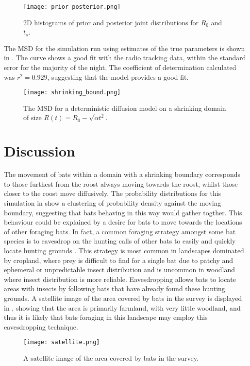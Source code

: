 \begin{figure} [h]
    \centering
        \texttt{[image: prior\_posterior.png]}
        \caption{2D histograms of prior and posterior joint distributions for $R_0$ and $t_s$.}
    \label{fig:posterior}
\end{figure}

 The MSD for the simulation run using estimates of the true parameters is shown in . The curve shows a good fit with the radio tracking data, within the standard error for the majority of the night. The coefficient of determination calculated was $r^2 = 0.929$, suggesting that the model provides a good fit.

\begin{figure} [h]
    \centering
        \texttt{[image: shrinking\_bound.png]}
        \caption{The MSD for a deterministic diffusion model on a shrinking domain of size $R(t) = R_0 - \sqrt{\alpha t^2}$. }
    \label{fig:fit}
\end{figure}

\section{Discussion}

 The movement of bats within a domain with a shrinking boundary corresponds to those furthest from the roost always moving towards the roost, whilst those closer to the roost move diffusively. The probability distributions for this simulation in  show a clustering of probability density against the moving boundary, suggesting that bats behaving in this way would gather togther. This behaviour could be explained by a desire for bats to move towards the locations of other foraging bats. In fact, a common foraging strategy amongst some bat species is to eavesdrop on the hunting calls of other bats to easily and quickly locate hunting grounds \cite{roelekelandscape, egert2018resource}. This strategy is most common in landscapes dominated by cropland, where prey is difficult to find for a single bat due to patchy and ephemeral or unpredictable insect distribution and is uncommon in woodland where insect distribution is more reliable. Eavesdropping allows bats to locate areas with insects by following bats that have already found these hunting grounds. A satellite image of the area covered by bats in the survey is displayed in , showing that the area is primarily farmland, with very little woodland, and thus it is likely that bats foraging in this landscape may employ this eavesdropping technique.

\begin{figure} [h]
    \centering
        \texttt{[image: satellite.png]}
        \caption{A satellite image of the area covered by bats in the survey. }
    \label{fig:satellite}
\end{figure}
